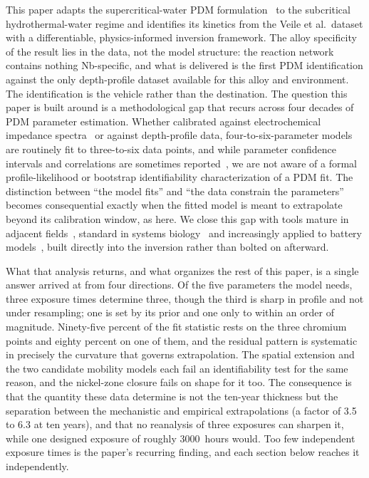 \documentclass[a4paper,fleqn]{cas-sc}
\begin{document}
This paper adapts the supercritical-water PDM
formulation~\citep{li2020scwpdm} to the subcritical hydrothermal-water
regime and identifies its kinetics from the Veile et al.\ dataset with a
differentiable, physics-informed inversion framework. The alloy
specificity of the result lies in the data, not the model structure:
the reaction network contains nothing Nb-specific, and what is delivered
is the first PDM identification against the only depth-profile dataset
available for this alloy and environment. The identification is the vehicle rather than the destination. The
question this paper is built around is a methodological gap that recurs
across four decades of PDM parameter estimation. Whether calibrated against electrochemical
impedance spectra~\citep{bojinov_mcm,ss316ln_pdm2024,ss321_pdm} or
against depth-profile data, four-to-six-parameter models are routinely
fit to three-to-six data points, and while parameter confidence
intervals and correlations are sometimes
reported~\citep{identifiability_electrochem1996}, we are not aware of a
formal profile-likelihood or bootstrap identifiability characterization
of a PDM fit. The distinction between ``the model fits'' and ``the data
constrain the parameters'' becomes consequential exactly when the fitted
model is meant to extrapolate beyond its calibration window, as here.
We close this gap with tools mature in adjacent
fields~\citep{raue2009identifiability,efron1979bootstrap,wieland2021identifiability},
standard in systems biology~\citep{biosystems_identifiability} and
increasingly applied to battery models~\citep{p2d_identifiability2021},
built directly into the inversion rather than bolted on afterward.

What that analysis returns, and what organizes the rest of this paper,
is a single answer arrived at from four directions. Of the five parameters the model needs, three exposure times determine three, though the third is sharp in profile and not under resampling; one is set by its prior and one only to within an order of magnitude.
Ninety-five percent of the fit statistic rests on the three chromium
points and eighty percent on one of them, and the residual pattern is
systematic in precisely the curvature that governs extrapolation. The spatial extension and the two candidate mobility models each fail an identifiability test for the same reason, and the nickel-zone closure fails on shape for it too.
The consequence is that the quantity these data determine is not the
ten-year thickness but the separation between the mechanistic and
empirical extrapolations (a factor of 3.5 to 6.3 at ten years), and that
no reanalysis of three exposures can sharpen it, while one designed
exposure of roughly 3000~hours would. Too few independent exposure times
is the paper's recurring finding, and each section below reaches it
independently.
\end{document}
